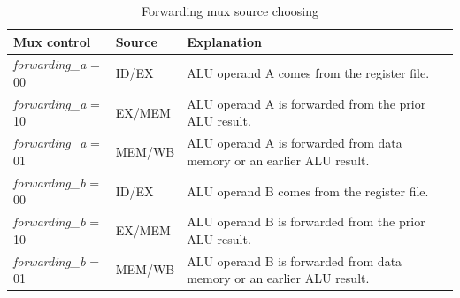 \begin{table}[h]
    \begin{tabular}{ l | l | p{6.5cm} }
        Mux control & Source & Explanation \\
        \hline                        
        \emph{forwarding\_a} = 00 & ID/EX  & ALU operand A comes from the register file. \\
        \emph{forwarding\_a} = 10 & EX/MEM & ALU operand A is forwarded from the prior ALU result. \\
        \emph{forwarding\_a} = 01 & MEM/WB & ALU operand A is forwarded from data memory or an earlier ALU result.\\
        \hline
        \emph{forwarding\_b} = 00 & ID/EX  & ALU operand B comes from the register file. \\
        \emph{forwarding\_b} = 10 & EX/MEM & ALU operand B is forwarded from the prior ALU result. \\
        \emph{forwarding\_b} = 01 & MEM/WB & ALU operand B is forwarded from data memory or an earlier ALU result. \\
    \end{tabular}
    \caption{Forwarding mux source choosing}
    \label{table:forwarding_results}
\end{table}